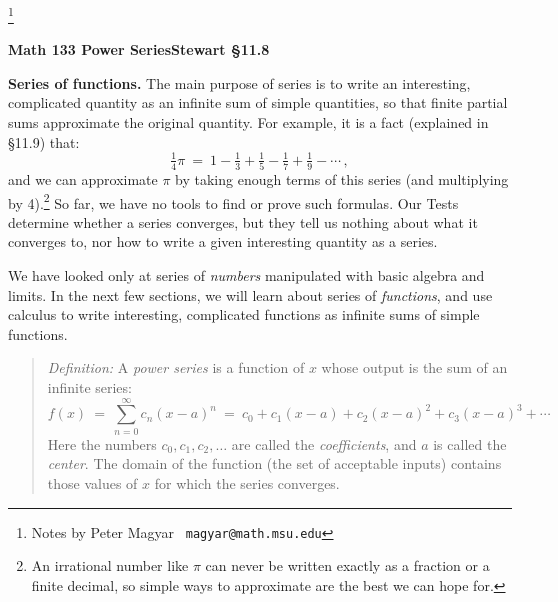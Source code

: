 \documentclass[11pt]{article}
\begin{document}
\footnote[0]{Notes by Peter Magyar \ {\tt magyar@math.msu.edu}}
\vspace{-1em}

\centerline{\bf Math 133\hspace{1.5em} \hfill{\Large\bf
Power Series}\hfill Stewart \S11.8}
\vspace{1em}

\noindent 
{\bf Series of functions.}
The main purpose of series is to write an interesting, 
complicated quantity as an infinite sum of simple quantities,
so that finite partial sums approximate the original quantity. 
For example, it is a fact (explained in \S11.9) that:
$$
\tfrac14 \pi \ =\ 1 -\tfrac1{3} + \tfrac15 -\tfrac17 + \tfrac19-\cdots\,,
$$
and we can approximate $\pi$ by taking enough terms of this series (and multiplying by 4).\footnote{
An irrational number like $\pi$ can never be written exactly as a fraction
or a finite decimal, so simple ways to approximate are the best we can hope for.
}
So far, we have no tools to find or prove such formulas.
Our Tests determine whether a series converges, 
but they tell us nothing about what it converges to,
nor how to write a given interesting quantity as a series.

We have looked only at series of {\it numbers} manipulated with basic algebra and limits. 
In the next few sections, we will learn about series of {\it functions},
and use calculus to write interesting, complicated functions as 
infinite sums of simple functions.

\begin{quote}
{\it Definition:} A {\it power series} is a function of $x$ whose output
is the sum of an infinite series:
$$
f(x) \ =\ \sum_{n=0}^\infty c_n(x{-}a)^n
\ =\ c_0 + c_1 (x{-}a) + c_2 (x{-}a)^2 + c_3 (x{-}a)^3 + \cdots
$$
Here the numbers $c_0,c_1,c_2,\ldots$ are called the {\it coefficients},
and $a$ is called the {\it center}.
The domain of the function (the set of acceptable inputs) contains those
values of $x$ for which the series converges.
\end{quote}
\end{document}
